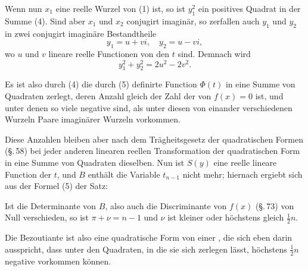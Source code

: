 
Wenn nun $x_1$ eine reelle Wurzel von (1) ist, so ist $y_1^2$ ein
positives Quadrat in der Summe (4). Sind aber $x_1$ und $x_2$ conjugirt
 imaginär, so zerfallen auch $y_1$ und $y_2$ in zwei conjugirt
imaginäre Bestandtheile
\[
y_1 = u + vi, \quad y_2 = u - vi,
\]
wo $u$ und $v$ lineare reelle Functionen von den $t$ sind. Demnach
wird
\[
y_1^2 + y_2^2 = 2u^2 - 2v^2.
\]

Es ist also durch (4) die durch (5) definirte Function
$\Phi(t)$ in eine Summe von Quadraten zerlegt, deren Anzahl
gleich der Zahl der  von $f(x) = 0$
ist, und unter denen so viele negative sind, als unter diesen
von einander verschiedenen Wurzeln Paare imaginärer
Wurzeln vorkommen.

Diese Anzahlen bleiben aber nach dem Trägheitsgesetz der
quadratischen Formen (\S.\,58) bei jeder anderen linearen reellen
Transformation der quadratischen Form in eine Summe von
Quadraten dieselben. Nun ist $S(y)$ eine reelle lineare Function
der $t$, und $B$ enthält die Variable $t_{n-1}$ nicht mehr; hiernach ergiebt
 sich aus der Formel (5) der Satz:


Ist die Determinante von $B$, also auch die Discriminante
von $f(x)$ (\S.\,73) von Null verschieden, so ist $\pi + \nu = n - 1$
und $\nu$ ist kleiner oder höchstens gleich $\frac{1}{2}n$.

Die Bezoutiante ist also eine quadratische Form von einer
, die sich eben darin ausspricht, dass unter
den Quadraten, in die sie sich zerlegen lässt, höchstens $\frac{1}{2}n$ negative
 vorkommen können.
